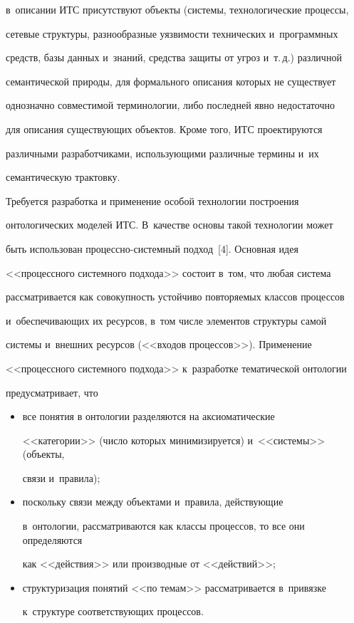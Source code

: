 в~описании ИТС присутствуют объекты (системы, технологические процессы,


сетевые структуры, разнообразные уязвимости технических и~программных


средств, базы данных и~знаний, средства защиты от угроз и~т.\,д.) различной


семантической природы, для формального описания которых не существует


однозначно совместимой терминологии, либо последней явно недостаточно


для описания существующих объектов. Кроме того, ИТС проектируются


различными разработчиками, использующими различные термины и~их


семантическую трактовку.





  Требуется разработка и применение особой технологии построения


онтологических моделей ИТС. В~качестве основы такой технологии может


быть использован про\-цес\-сно-сис\-тем\-ный подход~[4]. Основная идея


<<процессного системного подхода>> состоит в~том, что любая система


рассматривается как совокупность устойчиво повторяемых классов процессов


и~обеспечивающих их ресурсов, в~том числе элементов структуры самой


системы и~внешних ресурсов (<<входов процессов>>). Применение


<<процессного системного подхода>> к~разработке тематической онтологии


предусматривает, что


  \begin{itemize}


  \item все понятия в онтологии разделяются на аксиоматические


<<категории>> (число которых минимизируется) и~<<системы>> (объекты,


связи и~правила);


  \item  поскольку связи между объектами и~правила, действующие


в~онтологии, рассматриваются как классы процессов, то все они определяются


как <<действия>> или производные от <<действий>>;


  \item структуризация понятий <<по темам>> рассматривается в~привязке


к~структуре соответствующих процессов.


  \end{itemize}





